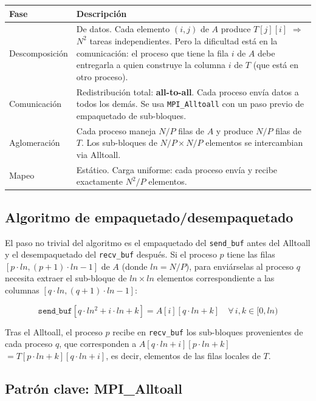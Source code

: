 \documentclass[12pt,a4paper]{article}
\begin{document}
\begin{tabular}{L{3cm} L{11cm}}
\toprule
\textbf{Fase} & \textbf{Descripción} \\
\midrule
Descomposición & De datos. Cada elemento $(i,j)$ de $A$ produce $T[j][i]$ $\Rightarrow$
  $N^2$ tareas independientes. Pero la dificultad está en la comunicación:
  el proceso que tiene la fila $i$ de $A$ debe entregarla a quien construye
  la columna $i$ de $T$ (que está en otro proceso). \\[4pt]
Comunicación & Redistribución total: \textbf{all-to-all}. Cada proceso envía datos a
  todos los demás. Se usa \texttt{MPI\_Alltoall} con un paso previo de
  empaquetado de sub-bloques. \\[4pt]
Aglomeración & Cada proceso maneja $N/P$ filas de $A$ y produce $N/P$ filas de $T$.
  Los sub-bloques de $N/P \times N/P$ elementos se intercambian via Alltoall. \\[4pt]
Mapeo & Estático. Carga uniforme: cada proceso envía y recibe exactamente
  $N^2/P$ elementos. \\
\bottomrule
\end{tabular}

\vspace{0.5cm}

\subsection{Algoritmo de empaquetado/desempaquetado}

El paso no trivial del algoritmo es el empaquetado del \texttt{send\_buf} antes del
Alltoall y el desempaquetado del \texttt{recv\_buf} después. Si el proceso $p$ tiene
las filas $[p \cdot ln, (p+1) \cdot ln - 1]$ de $A$ (donde $ln = N/P$), para
enviárselas al proceso $q$ necesita extraer el sub-bloque de $ln \times ln$ elementos
correspondiente a las columnas $[q \cdot ln, (q+1) \cdot ln - 1]$:

\[
  \texttt{send\_buf}[q \cdot ln^2 + i \cdot ln + k] = A[i][q \cdot ln + k]
  \quad \forall\, i,k \in [0, ln)
\]

Tras el Alltoall, el proceso $p$ recibe en \texttt{recv\_buf} los sub-bloques
provenientes de cada proceso $q$, que corresponden a $A[q \cdot ln + i][p \cdot ln + k]$
$= T[p \cdot ln + k][q \cdot ln + i]$, es decir, elementos de las filas locales de $T$.

\subsection{Patrón clave: MPI\_Alltoall}
\end{document}
